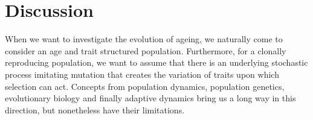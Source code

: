 \documentclass[11pt, a4paper]{article}
\theoremstyle{definition}
\begin{document}
%

    



    
\section{Discussion}
    When we want to investigate the evolution of ageing, we naturally come to consider an age and trait structured population. Furthermore, for a clonally reproducing population, we want to assume that there is an underlying stochastic process imitating mutation that creates the variation of traits upon which selection can act.
    Concepts from population dynamics, population genetics, evolutionary biology and finally adaptive dynamics bring us a long way in this direction, but nonetheless have their limitations.
\end{document}
